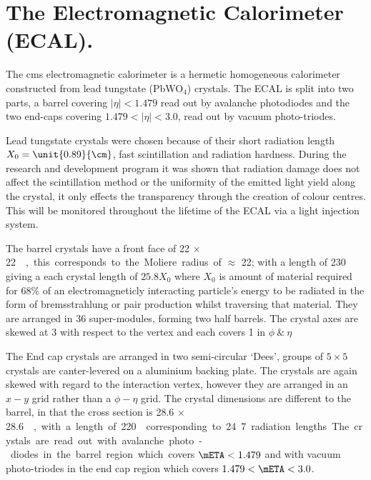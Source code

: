 
\section{The Electromagnetic Calorimeter (ECAL).} %
\label{sec:the_electromagnetic_calorimeter}
The \ac{cms} electromagnetic calorimeter is a hermetic homogeneous calorimeter 
constructed from lead tungstate (PbWO$_{4}$) crystals. The ECAL is split into 
two parts, a barrel covering $|\eta| < 1.479$ read out by avalanche photodiodes 
and the two end-caps covering $1.479 < |\eta| < 3.0$, read out by vacuum 
photo-triodes.

Lead tungstate crystals were chosen because of their short radiation length 
$X_{0}= \unit{0.89}{\cm}$, fast scintillation and radiation hardness. During 
the research and development program it was shown that radiation damage does 
not affect the scintillation method or the uniformity of the emitted light 
yield along the crystal, it only effects the transparency through the creation 
of colour centres. This will be monitored throughout the lifetime of the ECAL 
via a light injection system\cite{Smith:2000p5245}.

The barrel crystals have a front face of \unit{22 $\times$ 22}{\mm\squared}, 
this corresponds to the Moliere radius of $\approx $ \unit{22}{\mm}; with a 
length of \unit{230}{\mm} giving a each crystal length of $25.8 X_{0}$ where 
$X_{0}$ is amount of material required for 68$\%$ of an electromagneticly 
interacting particle's energy to be radiated in the form of bremsstrahlung or 
pair production whilst traversing that material. They are arranged in 36 
super-modules, forming two half barrels. The crystal axes are skewed at 
\unit{3}{\degree} with respect to the vertex and each covers \unit{1}{\degree} 
in $\phi ~ \& ~ \eta$

The End cap crystals are arranged in two semi-circular `Dees', groups of 
$5\times 5$ crystals are canter-levered on a aluminium backing plate. The 
crystals are again skewed with regard to the interaction vertex, however they 
are arranged in an $x-y$ grid rather than a $\phi - \eta$ grid. The crystal 
dimensions are different to the barrel, in that the cross section is \unit{28.6 
$\times$ 28.6}{\mm\squared}, with a length of \unit{220}{\mm} corresponding to 
24.7 radiation lengths

The crystals are read out with avalanche photo-diodes in the barrel region 
which covers $\mETA < 1.479$ and with vacuum photo-triodes in the end cap 
region which covers $1.479 < \mETA < 3.0$.

